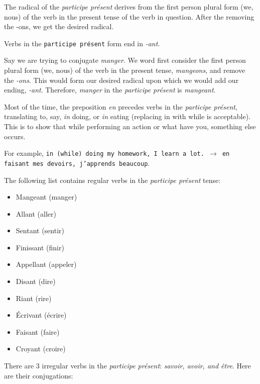 \documentclass[11pt, oneside]{book}
\begin{document}
{{The radical of the \textit{participe pr\'esent} derives from the first person plural form (we, nous) of the verb in the present tense of the verb in question. After the removing the -ons, we get the desired radical. \vspace{0.5\baselineskip}

Verbs in the \texttt{participe pr\'esent} form end in \textit{-ant}. \vspace{0.5\baselineskip}

Say we are trying to conjugate \textit{manger}. We word first consider the first person plural form (we, nous) of the verb in the present tense, \textit{mangeons}, and remove the \textit{-ons}. This would form our desired radical upon which we would add our ending, \textit{-ant}. Therefore, \textit{manger} in the \textit{participe pr\'esent} is \textit{mangeant}. \vspace{0.5\baselineskip}

Most of the time, the preposition \textit{en} precedes verbs in the \textit{participe pr\'esent}, translating to, say, \textit{in} doing, or \textit{in} eating (replacing in with while is acceptable). This is to show that while performing an action or what have you, something else occurs.  \vspace{0.5\baselineskip}

For example, \texttt{in (while) doing my homework, I learn a lot. $\rightarrow$ en faisant mes devoirs, j'apprends beaucoup}. \vspace{0.5\baselineskip}

The following list contains regular verbs in the \textit{participe pr\'esent} tense:  

\begin{itemize}
	\item Mangeant (manger)
	\item Allant (aller)
	\item Sentant (sentir)
	\item Finissant (finir)
	\item Appellant (appeler)
	\item Disant	(dire)
	\item Riant (rire)
	\item \'Ecrivant (\'ecrire)
	\item Faisant (faire)
	\item Croyant (croire)
\end{itemize}

There are 3 irregular verbs in the \textit{participe pr\'esent}: \textit{savoir, avoir, and \^etre}. Here are their conjugations:

}}
\end{document}
